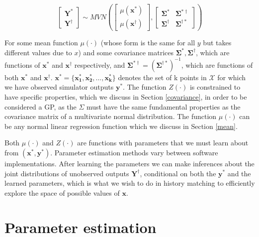\documentclass[
  12pt,
  a4paper,
  twoside]{book}
\begin{document}
\begin{equation}
\label{eq:joint-distro}
\begin{bmatrix} \mathbf{Y^*} \\
\mathbf{Y^\dagger}
\end{bmatrix}
\sim MVN\left( \begin{bmatrix} \mu(\mathbf{x^*})\\
\mu(\mathbf{x^\dagger}) \end{bmatrix},
 \begin{bmatrix} \mathbf{\Sigma^*} & \mathbf{\Sigma^{*\dagger}}\\
 \mathbf{\Sigma^\dagger} & \mathbf{\Sigma^{ \dagger *}} \end{bmatrix} \right)
\end{equation}

For some mean function \(\mu(\cdot)\) (whose form is the same for all \(y\) but takes different values due to \(x\)) and some covariance matrices \(\mathbf{\Sigma^*}, \mathbf{\Sigma^\dagger}\), which are functions of \(\mathbf{x^*}\) and \(\mathbf{x^\dagger}\) respectively, and \(\mathbf{\Sigma^{*\dagger}} = (\mathbf{\Sigma^{ \dagger *}})^{-1}\), which are functions of both \(\mathbf{x^*}\) and \(\mathbf{x^\dagger}\). \(\mathbf{x^*} = \{\mathbf{x^*_1}, \mathbf{x^*_2},...,\mathbf{x^*_k}\}\) denotes the set of k points in \(\mathcal{X}\) for which we have observed simulator outputs \(\mathbf{y^*}\). The function \(Z(\cdot)\) is constrained to have specific properties, which we discuss in Section \ref{covariance}, in order to be considered a GP, as the \(\Sigma\) must have the same fundamental properties as the covariance matrix of a multivariate normal distribution. The function \(\mu(\cdot)\) can be any normal linear regression function which we discuss in Section \ref{mean}.

Both \(\mu(\cdot)\) and \(Z(\cdot)\) are functions with parameters that we must learn about from \((\mathbf{x^*}, \mathbf{y^*})\). Parameter estimation methods vary between software implementations. After learning the parameters we can make inferences about the joint distributions of unobserved outputs \(\mathbf{Y^\dagger}\), conditional on both the \(\mathbf{y^*}\) and the learned parameters, which is what we wish to do in history matching to efficiently explore the space of possible values of \(\mathbf{x}\).

\hypertarget{model-selection}{%
\section{Parameter estimation}\label{model-selection}}
\end{document}
